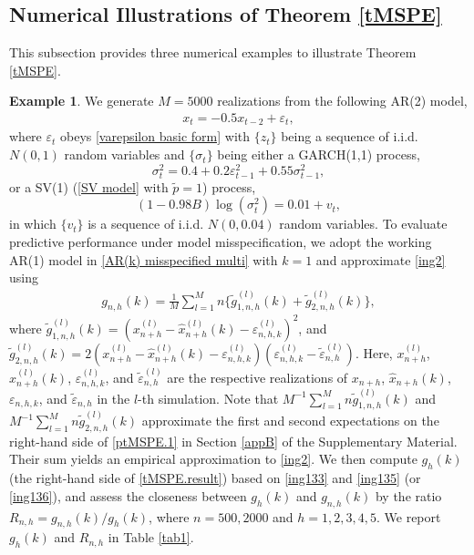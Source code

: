 \documentclass[ejsv2]{imsart}
\theoremstyle{plain}
\theoremstyle{definition}
\newtheorem{example}{Example}[section]
\theoremstyle{remark}
\begin{document}
\subsection{Numerical Illustrations of Theorem \ref{tMSPE}}\label{sec:4.1}
This subsection provides three numerical examples to illustrate Theorem \ref{tMSPE}.
\begin{example}\label{ex4.1}
We generate $M=5000$ realizations from the following AR(2) model,
\begin{eqnarray}
\label{ing133}
x_t=-0.5x_{t-2}+\varepsilon_t,
\end{eqnarray}
where
$\varepsilon_t$ obeys
\eqref{varepsilon basic form} with $\{z_t\}$ being a sequence of
i.i.d. $N(0,1)$ random variables
and $\{\sigma_t\}$ being either a GARCH(1,1) process,
\begin{equation}\label{ing135}
\sigma_t^2=0.4+0.2\varepsilon_{t-1}^2+0.55\sigma_{t-1}^2,
\end{equation}
or a SV(1) (\eqref{SV model} with $\tilde{p}=1$) process,
\begin{equation}\label{ing136}
(1-0.98B)\log(\sigma_t^2)=0.01+v_t,
\end{equation}
in which
$\{v_t\}$ is a sequence of i.i.d. $N(0,0.04)$ random variables.
To evaluate predictive performance under model misspecification,
we adopt the working AR(1) model in 
\eqref{AR(k) misspecified multi} with $k=1$ and
approximate \eqref{ing2}
using
\begin{eqnarray}
\label{ing123}
g_{n,h}(k)=\frac{1}{M}\sum_{l=1}^{M}n\{\tilde{g}^{(l)}_{1,n,h}(k)+\tilde{g}^{(l)}_{2,n,h}(k)\},
\end{eqnarray}
where
$\tilde{g}^{(l)}_{1,n,h}(k)=(x^{(l)}_{n+h}-\hat{x}^{(l)}_{n+h}(k)-\varepsilon^{(l)}_{n,h,k})^2$,  and $\tilde{g}^{(l)}_{2,n,h}(k)=2(x^{(l)}_{n+h}-\hat{x}^{(l)}_{n+h}(k)-\varepsilon^{(l)}_{n,h,k})(\varepsilon^{(l)}_{n,h,k}-\tilde{\varepsilon}^{(l)}_{n,h})$. Here, $x^{(l)}_{n+h}$, $\hat{x}^{(l)}_{n+h}(k)$, $\varepsilon^{(l)}_{n,h,k}$, and $\tilde{\varepsilon}^{(l)}_{n,h}$
are the respective realizations of
$x_{n+h}$, $\hat{x}_{n+h}(k)$, $\varepsilon_{n,h,k}$, and $\tilde{\varepsilon}_{n,h}$
in the $l$-th simulation.
Note that $M^{-1}\sum_{l=1}^{M}n\tilde{g}^{(l)}_{1,n,h}(k)$ and $M^{-1}\sum_{l=1}^{M}n\tilde{g}^{(l)}_{2,n,h}(k)$
approximate the first and second expectations on the right-hand side of \eqref{ptMSPE.1} in Section \ref{appB} of the Supplementary Material.
Their sum yields an empirical approximation to
\eqref{ing2}.
We then compute $g_{h}(k)$ (the right-hand side of \eqref{tMSPE.result}) based on \eqref{ing133} and \eqref{ing135} (or \eqref{ing136}),
and assess the closeness between $g_{h}(k)$ and $g_{n,h}(k)$ by
the ratio $R_{n,h}=g_{n,h}(k)/g_{h}(k)$,
where %
$n=500, 2000$ and $h=1,2,3,4,5$.
We report
$g_{h}(k)$ and $R_{n,h}$ in Table \ref{tab1}.
\end{example}
\end{document}
